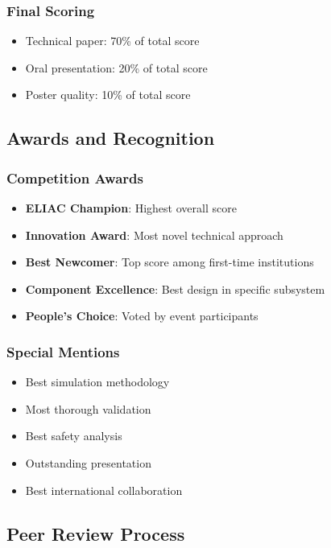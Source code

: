 \subsubsection{Final Scoring}
\begin{itemize}[noitemsep]
    \item Technical paper: 70\% of total score
    \item Oral presentation: 20\% of total score
    \item Poster quality: 10\% of total score
\end{itemize}

\subsection{Awards and Recognition}

\subsubsection{Competition Awards}
\begin{itemize}[noitemsep]
    \item \textbf{ELIAC Champion}: Highest overall score
    \item \textbf{Innovation Award}: Most novel technical approach
    \item \textbf{Best Newcomer}: Top score among first-time institutions
    \item \textbf{Component Excellence}: Best design in specific subsystem
    \item \textbf{People's Choice}: Voted by event participants
\end{itemize}

\subsubsection{Special Mentions}
\begin{itemize}[noitemsep]
    \item Best simulation methodology
    \item Most thorough validation
    \item Best safety analysis
    \item Outstanding presentation
    \item Best international collaboration
\end{itemize}

\subsection{Peer Review Process}

